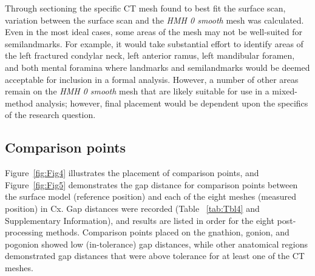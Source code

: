 \documentclass[review]{elsarticle}
\begin{document}
Through sectioning the specific CT mesh found to best fit the surface scan, variation between the surface scan and the \textit{HMH 0 smooth} mesh was calculated. Even in the most ideal cases, some areas of the mesh may not be well-suited for semilandmarks. For example, it would take substantial effort to identify areas of the left fractured condylar neck, left anterior ramus, left mandibular foramen, and both mental foramina where landmarks and semilandmarks would be deemed acceptable for inclusion in a formal analysis. However, a number of other areas remain on the \textit{HMH 0 smooth} mesh that are likely suitable for use in a mixed-method analysis; however, final placement would be dependent upon the specifics of the research question.

\subsection{Comparison points}
Figure~\ref{fig:Fig4} illustrates the placement of comparison points, and Figure~\ref{fig:Fig5} demonstrates the gap distance for comparison points between the surface model (reference position) and each of the eight meshes (measured position) in Cx. Gap distances were recorded (Table ~\ref{tab:Tbl4} and Supplementary Information), and results are listed in order for the eight post-processing methods. Comparison points placed on the gnathion, gonion, and pogonion showed low (in-tolerance) gap distances, while other anatomical regions demonstrated gap distances that were above tolerance for at least one of the CT meshes.
\end{document}
